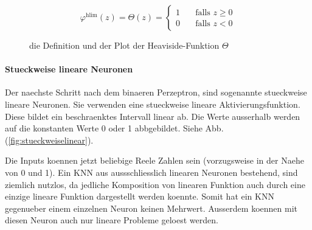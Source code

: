 \documentclass[../main]{subfiles}
\begin{document}
\begin{figure}[h!]
  \begin{minipage}[h!]{0.5\textwidth}
    \begin{equation*}
      \varphi^{\text{hlim}}(z) = \Theta(z) =
      \begin{cases}
        1 & \quad \text{falls } z \geq 0\\
        0 & \quad \text{falls } z < 0
      \end{cases}
    \end{equation*}

  \end{minipage}
  \begin{minipage}[h!]{0.5\textwidth}
    \centering
  \end{minipage}

  \caption{die Definition und der Plot der Heaviside-Funktion $\Theta$}
  \label{fig:heaviside}
\end{figure}

\paragraph{Stueckweise lineare Neuronen}
Der naechste Schritt nach dem binaeren Perzeptron, sind sogenannte stueckweise
lineare Neuronen.
Sie verwenden eine stueckweise lineare Aktivierungsfunktion. Diese bildet ein
beschraenktes Intervall linear ab. Die Werte ausserhalb werden auf die
konstanten Werte 0 oder 1 abbgebildet. Siehe Abb. (\ref{fig:stueckweiselinear}).
\par\medskip
Die Inputs koennen jetzt beliebige Reele Zahlen sein (vorzugsweise in der Naehe
von 0 und 1).
Ein KNN aus aussschliesslich linearen Neuronen bestehend, sind ziemlich nutzlos, da jedliche Komposition von
linearen Funktion auch durch eine einzige lineare Funktion dargestellt werden
koennte. Somit hat ein KNN gegenueber einem einzelnen Neuron keinen Mehrwert.
Ausserdem koennen mit diesen Neuron auch nur lineare Probleme geloest werden.
\end{document}
